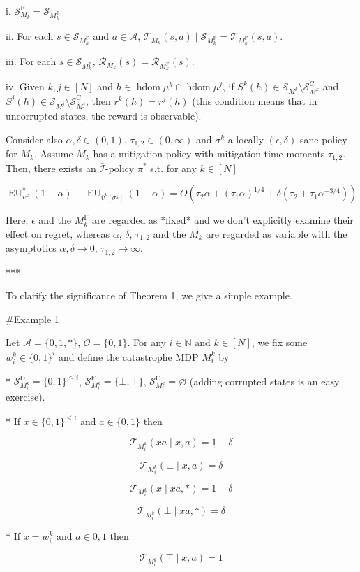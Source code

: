\documentclass[a4paper]{article}
\newcommand{\Bool}{\{0,1\}}
\newcommand{\AP}[1]{\left(#1\right)}
\newcommand{\AB}[1]{\left[#1\right]}
\newcommand{\Nats}{\mathbb{N}}
\newcommand{\Ob}{\mathcal{O}}
\newcommand{\A}{\mathcal{A}}
\newcommand{\St}{\mathcal{S}}
\newcommand{\T}{\mathcal{T}}
\newcommand{\R}{\mathcal{R}}
\newcommand{\In}{\mathcal{I}}
\newcommand{\Adi}{{\bar{\In}}}
\DeclareMathOperator{\HD}{hdom}
\newcommand{\SF}{\St^{\text{F}}}
\newcommand{\SD}{\St^{\text{D}}}
\newcommand{\SC}{\St^{\text{C}}}
\newcommand{\MF}{M^{\text{F}}}
\newcommand{\EU}{\operatorname{EU}}
\begin{document}
i. $\SF_{M_k} = \St_{\MF_k}$

ii. For each $s \in \St_{\MF_k}$ and $a \in \A$, $\T_{M_k}(s,a) \mid \St_{\MF_k} = \T_{\MF_k}(s,a)$.

iii. For each $s \in \St_{\MF_k}$, $\R_{M_k}(s)=\R_{\MF_k}(s)$.

iv. Given $k,j \in [N]$ and $h \in \HD{\mu^k} \cap \HD{\mu^j}$, if $S^k(h) \in \St_{M^k} \setminus \SC_{M^k}$ and $S^j(h) \in \St_{M^j} \setminus \SC_{M^j}$, then $r^k(h)=r^j(h)$ (this condition means that in uncorrupted states, the reward is observable).

Consider also $\alpha,\delta\in(0,1)$, $\tau_{1,2} \in (0,\infty)$ and $\sigma^k$ a locally $(\epsilon,\delta)$-sane policy for $M_k$. Assume $M_k$ has a mitigation policy with mitigation time moments $\tau_{1,2}$. Then, there exists an $\Adi$-policy $\pi^*$ s.t. for any $k \in [N]$

$$\EU_{\upsilon^k}^*(1-\alpha) - \EU_{\bar{\upsilon}^k\AB{\sigma^k}}(1-\alpha) = O\AP{\tau_2 \alpha + (\tau_1 \alpha)^{1/4} + \delta \AP{\tau_2 + \tau_1 \alpha^{-3/4}}}$$

Here, $\epsilon$ and the $\MF_k$ are regarded as *fixed* and we don't explicitly examine their effect on regret, whereas $\alpha$, $\delta$, $\tau_{1,2}$ and the $M_k$ are regarded as variable with the asymptotics $\alpha,\delta \rightarrow 0$, $\tau_{1,2} \rightarrow \infty$.

***

To clarify the significance of Theorem 1, we give a simple example.

\#Example 1

Let $\A = \{0,1,*\}$, $\Ob=\Bool$. For any $i \in \Nats$ and $k \in [N]$, we fix some $w_i^k \in \Bool^i$ and define the catastrophe MDP $M_i^k$ by

* $\SD_{M_i^k} = \Bool^{\leq i}$, $\SF_{M_i^k} = \{\bot,\top\}$, $\SC_{M_i^k} = \varnothing$ (adding corrupted states is an easy exercise).

* If $x \in \Bool^{< i}$ and $a \in \Bool$ then 

$$\T_{M_i^k}(xa \mid x,a) = 1 - \delta$$

$$\T_{M_i^k}(\bot \mid x,a) = \delta$$

$$\T_{M_i^k}(x \mid xa,*) = 1 - \delta$$

$$\T_{M_i^k}(\bot \mid xa,*) = \delta$$

* If $x = w_i^k$ and $a \in {0,1}$ then

$$\T_{M_i^k}(\top \mid x,a) = 1$$
\end{document}
